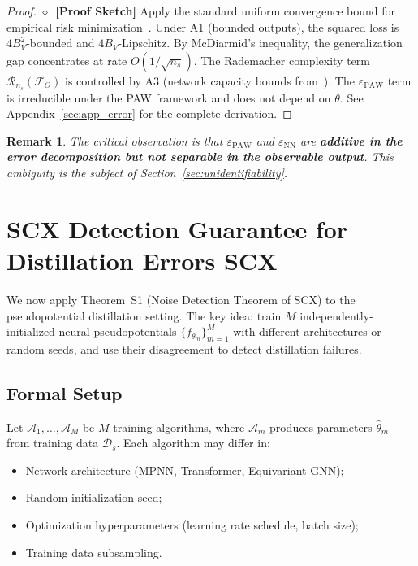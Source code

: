 \documentclass[11pt,a4paper]{article}
\newtheorem{remark}[theorem]{Remark}
\theoremstyle{definition}
\newcommand{\rigorSketch}[0]{$\diamond$~\textbf{[Proof Sketch]}}
\newcommand{\SCX}{\textsc{SCX}}
\newcommand{\ThmSCXNoise}{Theorem~S1}
\begin{document}
\begin{proof}\rigorSketch
Apply the standard uniform convergence bound for empirical risk minimization~\cite{Bartlett2002}. Under A1 (bounded outputs), the squared loss is $4B_V^2$-bounded and $4B_V$-Lipschitz. By McDiarmid's inequality, the generalization gap concentrates at rate $O(1/\sqrt{n_s})$. The Rademacher complexity term $\mathcal{R}_{n_s}(\mathcal{F}_\Theta)$ is controlled by A3 (network capacity bounds from~\cite{Bartlett2017}). The $\varepsilon_{\mathrm{PAW}}$ term is irreducible under the PAW framework and does not depend on $\theta$. See Appendix~\ref{sec:app_error} for the complete derivation.
\end{proof}

\begin{remark}
The critical observation is that $\varepsilon_{\mathrm{PAW}}$ and $\varepsilon_{\mathrm{NN}}$ are \textbf{additive in the error decomposition but not separable in the observable output}. This ambiguity is the subject of Section~\ref{sec:unidentifiability}.
\end{remark}

\section{SCX Detection Guarantee for Distillation Errors SCX}
\label{sec:detection}

We now apply \ThmSCXNoise{} (Noise Detection Theorem of \SCX) to the pseudopotential distillation setting. The key idea: train $M$ independently-initialized neural pseudopotentials $\{f_{\theta_m}\}_{m=1}^M$ with different architectures or random seeds, and use their disagreement to detect distillation failures.

\subsection{Formal Setup}

Let $\mathcal{A}_1, \ldots, \mathcal{A}_M$ be $M$ training algorithms, where $\mathcal{A}_m$ produces parameters $\hat{\theta}_m$ from training data $\mathcal{D}_s$. Each algorithm may differ in:
\begin{itemize}
    \item Network architecture (MPNN, Transformer, Equivariant GNN);
    \item Random initialization seed;
    \item Optimization hyperparameters (learning rate schedule, batch size);
    \item Training data subsampling.
\end{itemize}
\end{document}
